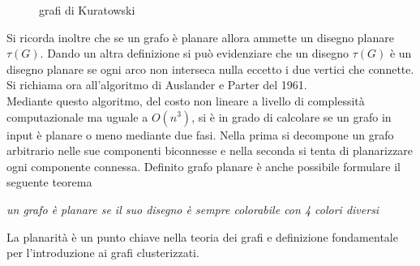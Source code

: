 {\begin{figure}[!htb]
\begin{center}
	\end{center}
	\caption{grafi di Kuratowski \label{fig:kuratowski}}
\end{figure}
Si ricorda inoltre che se un grafo è planare allora ammette un disegno planare $\tau(G)$. Dando un altra definizione si può evidenziare che un disegno $\tau(G)$ è un disegno planare se ogni arco non interseca nulla eccetto i due vertici che connette. Si richiama ora all'algoritmo di Auslander e Parter del 1961.\\ 
Mediante questo algoritmo, del costo non lineare a livello di complessità computazionale ma uguale a $O(n^3)$, si è in grado di calcolare se un grafo in input è planare o meno mediante due fasi. Nella prima si decompone un grafo arbitrario nelle sue componenti biconnesse e nella seconda si tenta di planarizzare ogni componente connessa. Definito grafo planare è anche possibile formulare il seguente teorema
\begin{center}
	\textit{un grafo è planare se il suo disegno è sempre colorabile con 4 colori diversi}
\end{center}
La planarità è un punto chiave nella teoria dei grafi e definizione fondamentale per l'introduzione ai grafi clusterizzati.

}
